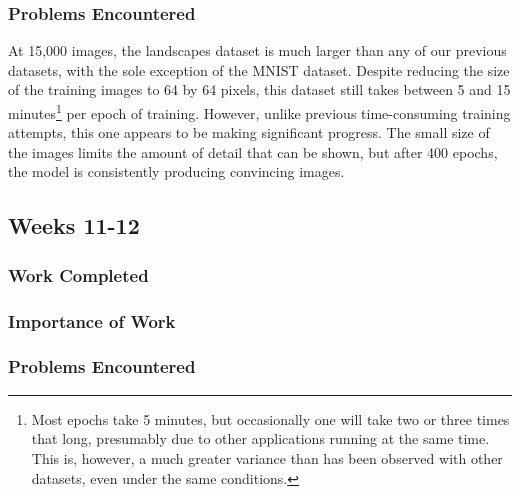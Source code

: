 \documentclass[12pt,letterpaper]{article}
\begin{document}
			\subsubsection{Problems Encountered}
				At 15,000 images, the landscapes dataset is much larger than any of our previous datasets, with the sole exception of the MNIST dataset.
				Despite reducing the size of the training images to 64 by 64 pixels, this dataset still takes between 5 and 15 minutes\footnote{Most epochs take 5 minutes, but occasionally one will take two or three times that long, presumably due to other applications running at the same time. This is, however, a much greater variance than has been observed with other datasets, even under the same conditions.} per epoch of training.
				However, unlike previous time-consuming training attempts, this one appears to be making significant progress.
				The small size of the images limits the amount of detail that can be shown, but after 400 epochs, the model is consistently producing convincing images.

		\subsection{Weeks 11-12}
			\subsubsection{Work Completed}

			\subsubsection{Importance of Work}

			\subsubsection{Problems Encountered}



\nocite{*}
\end{document}
